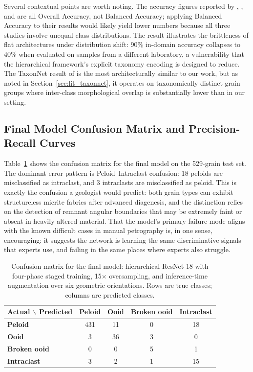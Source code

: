 \documentclass[a4paper,fleqn]{cas-dc}
\begin{document}
Several contextual points are worth noting. The accuracy figures reported by \citet{pireslima2020}, \citet{ho2023}, and \citet{liudunham2023} are all Overall Accuracy, not Balanced Accuracy; applying Balanced Accuracy to their results would likely yield lower numbers because all three studies involve unequal class distributions. The \citet{pireslima2020} result illustrates the brittleness of flat architectures under distribution shift: 90\% in-domain accuracy collapses to 40\% when evaluated on samples from a different laboratory, a vulnerability that the hierarchical framework's explicit taxonomy encoding is designed to reduce. The TaxonNet result of \citet{ho2023} is the most architecturally similar to our work, but as noted in Section~\ref{sec:lit_taxonnet}, it operates on taxonomically distinct grain groups where inter-class morphological overlap is substantially lower than in our setting.

\subsection{Final Model Confusion Matrix and Precision-Recall Curves}
Table~\ref{tab:confusion} shows the confusion matrix for the final model on the 529-grain test set. The dominant error pattern is Peloid--Intraclast confusion: 18 peloids are misclassified as intraclast, and 3 intraclasts are misclassified as peloid. This is exactly the confusion a geologist would predict: both grain types can exhibit structureless micrite fabrics after advanced diagenesis, and the distinction relies on the detection of remnant angular boundaries that may be extremely faint or absent in heavily altered material. That the model's primary failure mode aligns with the known difficult cases in manual petrography is, in one sense, encouraging: it suggests the network is learning the same discriminative signals that experts use, and failing in the same places where experts also struggle.

\begin{table}[h]
\centering
\caption{Confusion matrix for the final model: hierarchical ResNet-18 with four-phase staged training, 15$\times$ oversampling, and inference-time augmentation over six geometric orientations. Rows are true classes; columns are predicted classes.}
\label{tab:confusion}
\begin{tabular*}{\tblwidth}{@{}lcccc@{}}
\toprule
\textbf{Actual $\backslash$ Predicted} & \textbf{Peloid} & \textbf{Ooid} & \textbf{Broken ooid} & \textbf{Intraclast} \\
\midrule
\textbf{Peloid}       & 431 & 11 & 0 & 18 \\
\textbf{Ooid}         &   3 & 36 & 3 &  0 \\
\textbf{Broken ooid}  &   0 &  0 & 5 &  1 \\
\textbf{Intraclast}   &   3 &  2 & 1 & 15 \\
\bottomrule
\end{tabular*}
\end{table}
\end{document}
